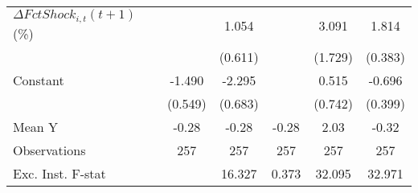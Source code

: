 {\begin{tabular}{l*{5}{c}}
\addlinespace
$ \Delta FctShock_{i,t}(t+1)$ (\%)&                     &       1.054         &                     &       3.091\sym{*}  &       1.814\sym{***}\\
                    &                     &     (0.611)         &                     &     (1.729)         &     (0.383)         \\
\addlinespace
Constant            &      -1.490\sym{**} &      -2.295\sym{***}&                     &       0.515         &      -0.696         \\
                    &     (0.549)         &     (0.683)         &                     &     (0.742)         &     (0.399)         \\
\midrule
Mean Y              &       -0.28         &       -0.28         &       -0.28         &        2.03         &       -0.32         \\
Observations        &         257         &         257         &         257         &         257         &         257         \\
Exc. Inst. F-stat   &                     &      16.327         &       0.373         &      32.095         &      32.971         \\
\bottomrule
\end{tabular}
}
